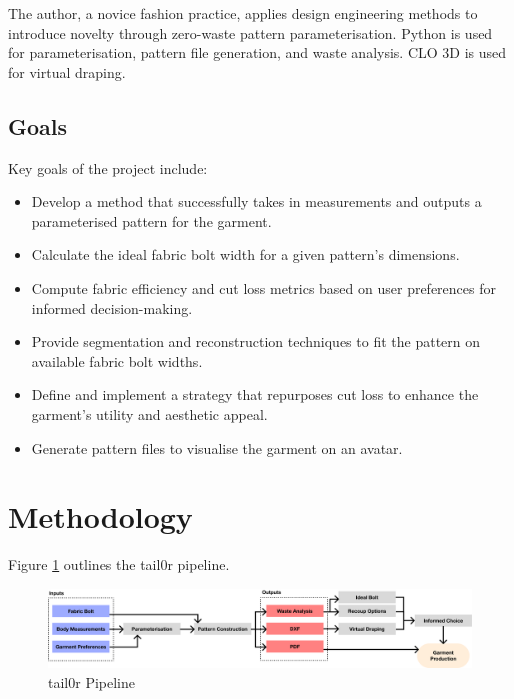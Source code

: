 The author, a novice  fashion practice, applies design engineering methods to introduce novelty through zero-waste pattern parameterisation. Python is used for parameterisation, pattern file generation, and waste analysis. CLO 3D is used for virtual draping.

\subsection{Goals}
Key goals of the project include:
\begin{itemize}
    \item Develop a method that successfully takes in measurements and outputs a parameterised pattern for the garment.
    \item Calculate the ideal fabric bolt width for a given pattern's dimensions.
    \item Compute fabric efficiency and cut loss metrics based on user preferences for informed decision-making.
    \item Provide segmentation and reconstruction techniques to fit the pattern on available fabric bolt widths.
    \item Define and implement a strategy that repurposes cut loss to enhance the garment's utility and aesthetic appeal.
    \item Generate pattern files to visualise the garment on an avatar.
\end{itemize}

\section{Methodology}
Figure \ref{fig:tail0r pipeline} outlines the tail0r pipeline.

\begin{figure} [h]
    \centering
    \includegraphics[width = \textwidth]{Images/tailor pipeline.png}
    \caption{tail0r Pipeline}
    \label{fig:tail0r pipeline}
\end{figure}

